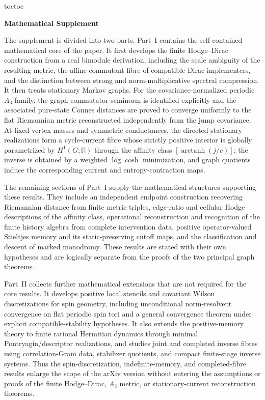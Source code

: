 \documentclass[11pt]{article}
\makeatletter
\newif\ifmathsupplement
\let\RG@addcontentsline\addcontentsline
\renewcommand{\addcontentsline}[3]{%
  \def\RG@tocname{#1}\def\RG@toc{toc}%
  \ifx\RG@tocname\RG@toc
    \RG@addcontentsline{toc}{#2}{#3}%
    \ifmathsupplement
      \RG@addcontentsline{supptoc}{#2}{#3}%
    \else
      \RG@addcontentsline{maintoc}{#2}{#3}%
    \fi
  \else
    \RG@addcontentsline{#1}{#2}{#3}%
  \fi}
\theoremstyle{definition}
\theoremstyle{remark}
\theoremstyle{definition}
\theoremstyle{remark}
\makeatother
\begin{document}
\clearpage
{}
{}
\mathsupplementtrue
\appendix
\renewcommand{\thesection}{S\arabic{section}}
\renewcommand{\theHsection}{supp.\arabic{section}}
\setcounter{section}{0}

\begin{center}
 {\LARGE\bfseries Mathematical Supplement}
\end{center}
\medskip

The supplement is divided into two parts.  Part~I contains the self-contained
mathematical core of the paper.  It first develops the finite Hodge--Dirac
construction from a real bimodule derivation, including the scale ambiguity of
the resulting metric, the affine commutant fibre of compatible Dirac
implementers, and the distinction between strong and norm-multiplicative
spectral compression.  It then treats stationary Markov graphs.  For the
covariance-normalized periodic $A_3$ family, the graph commutator seminorm is
identified explicitly and the associated pure-state Connes distances are proved
to converge uniformly to the flat Riemannian metric reconstructed independently
from the jump covariance.  At fixed vertex masses and symmetric conductances,
the directed stationary realizations form a cycle-current fibre whose strictly
positive interior is globally parametrized by
$H^1(G;\mathbb R)$ through the affinity class
$[\operatorname{arctanh}(j/c)]$; the inverse is obtained by a weighted
$\log\cosh$ minimization, and graph quotients induce the corresponding
current and entropy-contraction maps.

The remaining sections of Part~I supply the mathematical structures supporting
these results.  They include an independent endpoint construction recovering
Riemannian distance from finite metric triples, edge-ratio and cellular Hodge
descriptions of the affinity class, operational reconstruction and recognition
of the finite history algebra from complete intervention data, positive
operator-valued Stieltjes memory and its static-preserving cutoff maps, and the
classification and descent of marked monodromy.  These results are stated with
their own hypotheses and are logically separate from the proofs of the two
principal graph theorems.

Part~II collects further mathematical extensions that are not required for the
core results.  It develops positive local stencils and covariant Wilson
discretizations for spin geometry, including unconditional norm-resolvent
convergence on flat periodic spin tori and a general convergence theorem under
explicit compatible-stability hypotheses.  It also extends the positive-memory
theory to finite rational Hermitian dynamics through minimal
Pontryagin/descriptor realizations, and studies joint and completed inverse
fibres using correlation-Gram data, stabilizer quotients, and compact
finite-stage inverse systems.  Thus the spin-discretization,
indefinite-memory, and completed-fibre results enlarge the scope of the arXiv
version without entering the assumptions or proofs of the finite
Hodge--Dirac, $A_3$ metric, or stationary-current reconstruction theorems.
\end{document}
